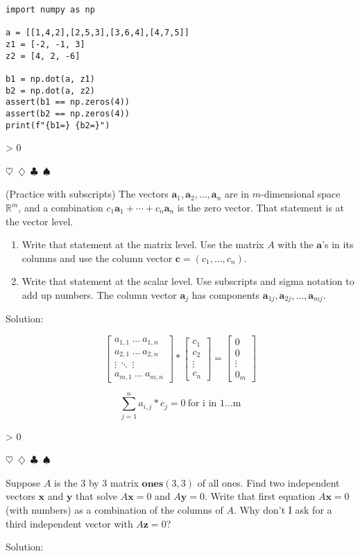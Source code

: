 \documentclass{article}
\newcommand{\sep}{\begin{center}$\heartsuit$~$\diamondsuit$~$\clubsuit$~$\spadesuit$\end{center}}
\newcommand{\sol}{\begin{center}\small{Solution:}\end{center}}
\newcommand{\vect}[1]{\ensuremath{\boldsymbol{#1}}}
\newcounter{prblm}
\newcommand{\problem}[1]{
  \ifnum\value{prblm} > 0 \sep \fi
  \stepcounter{prblm}
  \noindent\textbf{\arabic{prblm}} #1
  \sol
}
\begin{document}
\begin{verbatim}
import numpy as np

a = [[1,4,2],[2,5,3],[3,6,4],[4,7,5]]
z1 = [-2, -1, 3]
z2 = [4, 2, -6]

b1 = np.dot(a, z1)
b2 = np.dot(a, z2)
assert(b1 == np.zeros(4))
assert(b2 == np.zeros(4))
print(f"{b1=} {b2=}")
\end{verbatim}


\problem{(Practice with subscripts) The vectors $\vect{a}_1, \vect{a}_2, \ldots , \vect{a}_n$ are in $m$-dimensional space $\mathbb{R}^m$, and a combination $c_1\vect{a}_1 + \cdots + c_n\vect{a}_n$ is the zero vector. That statement is at the vector level. 
\begin{enumerate}[label=(\arabic*)]
\item Write that statement at the matrix level. Use the matrix $A$ with the $\vect{a}$'s in its columns and use the column vector $\vect{c} = (c_1, \ldots, c_n)$.
\item Write that statement at the scalar level. Use subscripts and sigma notation to add up numbers. The column vector $\vect{a}_j$ has components $\vect{a}_{1j}, \vect{a}_{2j}, \ldots, \vect{a}_{mj}$.
\end{enumerate}}


\begin{displaymath}
  \begin{bmatrix}
    a_{1,1} ~ \ldots ~ a_{1,n} \\
    a_{2,1} ~ \ldots ~ a_{2,n} \\
    \vdots ~ \ddots ~ \vdots \\
    a_{m,1} ~ \ldots ~ a_{m,n}
  \end{bmatrix}
  * \begin{bmatrix} c_1 \\ c_2 \\ \vdots \\ c_n \end{bmatrix}
  = \begin{bmatrix} 0 \\ 0 \\ \vdots \\ 0_m \end{bmatrix}
\end{displaymath}

\begin{displaymath}
  \sum_{j=1}^{n} a_{i,j} * c_j = 0 ~ \text{for i in 1\ldots m}
\end{displaymath}


\problem{Suppose $A$ is the 3 by 3 matrix $\mathbf{ones}(3, 3)$ of all ones. Find two independent vectors $\vect{x}$ and $\vect{y}$ that solve $A\vect{x} = 0$ and $A\vect{y} = 0$. Write that first equation $A\vect{x} = 0$ (with numbers) as a combination of the columns of $A$. Why don't I ask for a third independent vector with $A\vect{z} = 0$?}
\end{document}
